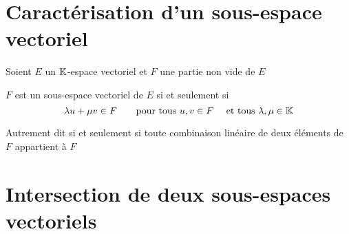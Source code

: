\section{Caractérisation d'un sous-espace vectoriel}

\begin{frame}
\begin{theoreme}
Soient $E$ un $\mathbb{K}$-espace vectoriel et $F$ une partie non vide de $E$

$F$ est un sous-espace vectoriel de $E$ si et seulement si
$$\lambda u + \mu v \in F \qquad \text{pour tous } u,v \in F \quad \text{ et tous } \lambda, \mu \in \mathbb{K}$$

\pause

Autrement dit si et seulement si toute combinaison linéaire de deux éléments 
de $F$ appartient à $F$
\end{theoreme}  

\end{frame}

\section{Intersection de deux sous-espaces vectoriels}


